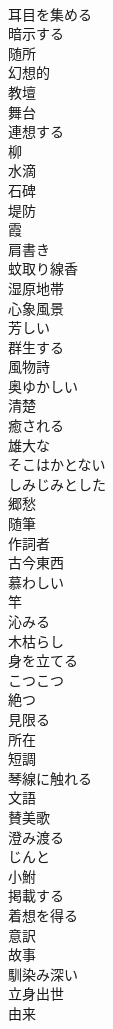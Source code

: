 \documentclass[8pt]{extreport}
\begin{document}
\begin{CJK}{UTF8}{min}
\\	耳目を集める
\\	暗示する
\\	随所
\\	幻想的
\\	教壇
\\	舞台
\\	連想する
\\	柳
\\	水滴
\\	石碑
\\	堤防
\\	霞
\\	肩書き
\\	蚊取り線香
\\	湿原地帯
\\	心象風景
\\	芳しい
\\	群生する
\\	風物詩
\\	奥ゆかしい
\\	清楚
\\	癒される
\\	雄大な
\\	そこはかとない
\\	しみじみとした
\\	郷愁
\\	随筆
\\	作詞者
\\	古今東西
\\	慕わしい
\\	竿
\\	沁みる
\\	木枯らし
\\	身を立てる
\\	こつこつ
\\	絶つ
\\	見限る
\\	所在
\\	短調
\\	琴線に触れる
\\	文語
\\	賛美歌
\\	澄み渡る
\\	じんと
\\	小鮒
\\	掲載する
\\	着想を得る
\\	意訳
\\	故事
\\	馴染み深い
\\	立身出世
\\	由来

\end{CJK}
\end{document}
